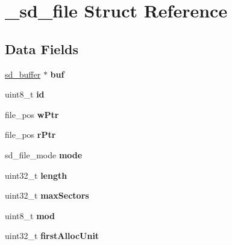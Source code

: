 \hypertarget{struct__sd__file}{\section{\-\_\-sd\-\_\-file \-Struct \-Reference}
\label{struct__sd__file}
}
\subsection*{\-Data \-Fields}
\begin{DoxyCompactItemize}
\item 
\hypertarget{struct__sd__file_a82eaf7fd73d161ff40d84f09f80e0754}{\hyperlink{struct__sd__buffer}{sd\-\_\-buffer} $\ast$ {\bfseries buf}}\label{struct__sd__file_a82eaf7fd73d161ff40d84f09f80e0754}

\item 
\hypertarget{struct__sd__file_a0209d4e86ee2b5d76852c4e650826c44}{uint8\-\_\-t {\bfseries id}}\label{struct__sd__file_a0209d4e86ee2b5d76852c4e650826c44}

\item 
\hypertarget{struct__sd__file_ac8bfafe6e70c03b2b51f2368c60590ef}{file\-\_\-pos {\bfseries w\-Ptr}}\label{struct__sd__file_ac8bfafe6e70c03b2b51f2368c60590ef}

\item 
\hypertarget{struct__sd__file_a56a2d19f03361bc13a84b9bbe3e3e9a0}{file\-\_\-pos {\bfseries r\-Ptr}}\label{struct__sd__file_a56a2d19f03361bc13a84b9bbe3e3e9a0}

\item 
\hypertarget{struct__sd__file_a32ddb16309961025e7e045c02f5be338}{sd\-\_\-file\-\_\-mode {\bfseries mode}}\label{struct__sd__file_a32ddb16309961025e7e045c02f5be338}

\item 
\hypertarget{struct__sd__file_a0964e7e8abf0b333b45e72a1a13b471d}{uint32\-\_\-t {\bfseries length}}\label{struct__sd__file_a0964e7e8abf0b333b45e72a1a13b471d}

\item 
\hypertarget{struct__sd__file_a9b2558ff55f0d3a72defe1b18b669fd5}{uint32\-\_\-t {\bfseries max\-Sectors}}\label{struct__sd__file_a9b2558ff55f0d3a72defe1b18b669fd5}

\item 
\hypertarget{struct__sd__file_ac17104cc625d127bdbc375891b3c0f9f}{uint8\-\_\-t {\bfseries mod}}\label{struct__sd__file_ac17104cc625d127bdbc375891b3c0f9f}

\item 
\hypertarget{struct__sd__file_a5851a111a6c74e9481c2ab2a8865a2ad}{uint32\-\_\-t {\bfseries first\-Alloc\-Unit}}\label{struct__sd__file_a5851a111a6c74e9481c2ab2a8865a2ad}


\end{DoxyCompactItemize}
